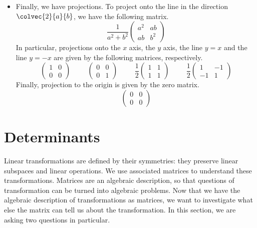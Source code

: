 \documentclass[fleqn,letterpaper]{report}
\begin{document}
\begin{itemize}
\begin{equation*}
\end{equation*}
\item Finally, we have projections. To project onto the line
in the direction $\colvec{2}{a}{b}$, we have the following
matrix.
\begin{equation*}
\frac{1}{a^2 + b^2}\left( \begin{matrix}
a^2 & ab \\ ab & b^2
\end{matrix} \right) 
\end{equation*}
In particular, projections onto the $x$ axis, the $y$ axis, the
line $y=x$ and the line $y=-x$ are given by the following
matrices, respectively.
\begin{equation*}
\left( \begin{matrix}
1 & 0 \\ 0 & 0 
\end{matrix} \right) 
\hspace{1cm}
\left( \begin{matrix}
0 & 0 \\ 0 & 1 
\end{matrix} \right) 
\hspace{1cm}
\frac{1}{2} \left( \begin{matrix}
1 & 1 \\ 1 & 1 
\end{matrix} \right) 
\hspace{1cm}
\frac{1}{2} \left( \begin{matrix}
1 & -1 \\ -1 & 1 
\end{matrix} \right) 
\end{equation*}
Finally, projection to the origin is given by the zero matrix.
\begin{equation*}
\left( \begin{matrix}
0 & 0 \\ 0 & 0 
\end{matrix} \right) 
\end{equation*}
\end{itemize}

\section{Determinants}
\label{determinants}

Linear transformations are defined by their symmetries: they
preserve linear subspaces and linear operations. We use
associated matrices to understand these transformations.
Matrices are an algebraic description, so that questions of
transformation can be turned into algebraic problems.  Now
that we have the algebraic description of transformations as
matrices, we want to investigate what else the matrix can tell
us about the transformation. In this section, we are asking
two questions in particular.
\end{document}
